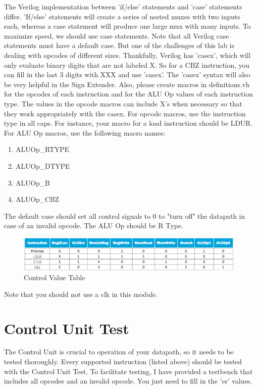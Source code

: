 The Verilog implementation between 'if/else' statements and 'case' statements differ.  'If/else' statements will create a series of nested muxes with two inputs each, whereas a case statement will produce one large mux with many inputs.  To maximize speed, we should use case statements. Note that all Verilog case statements must have a default case. But one of the challenges of this lab is dealing with opcodes of different sizes.  Thankfully, Verilog has 'casex', which will only evaluate binary digits that are not labeled X.  So for a CBZ instruction, you can fill in the last 3 digits with XXX and use 'casex'.  The 'casex' syntax will also be very helpful in the Sign Extender.  Also, please create macros in definitions.vh for the opcodes of each instruction and for the ALU Op values of each instruction type.  The values in the opcode macros can include X's when necessary so that they work appropriately with the casex.  For opcode macros, use the instruction type in all caps.  For instance, your macro for a load instruction should be LDUR.  For ALU Op macros,  use the following macro names:
\begin{enumerate}
	\item ALUOp\_RTYPE
	\item ALUOp\_DTYPE
	\item ALUOp\_B
	\item ALUOp\_CBZ
\end{enumerate} 

The default case should set all control signals to 0 to "turn off" the datapath in case of an invalid opcode.  The ALU Op should be R Type.

\begin{figure}
	\caption{Control Value Table}\label{fig:control_value_table}
	\begin{center}
		\includegraphics[width=4.75in]{../images/control_value_table.png}
	\end{center}
\end{figure} 

Note that you should not use a clk in this module.

\section{Control Unit Test}
The Control Unit is crucial to operation of your datapath, so it needs to be tested thoroughly.  Every supported instruction (listed above) should be tested with the Control Unit Test.  To facilitate testing, I have provided a testbench that includes all opcodes and an invalid opcode.  You just need to fill in the 'er' values.

